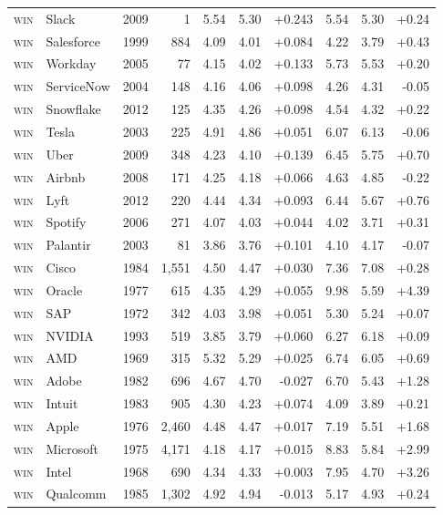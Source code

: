 \begin{tabular}{lllrrrrrrr}
\textsc{win} & Slack & 2009 & 1 & 5.54 & 5.30 & +0.243 & 5.54 & 5.30 & +0.24 \\
\textsc{win} & Salesforce & 1999 & 884 & 4.09 & 4.01 & +0.084 & 4.22 & 3.79 & +0.43 \\
\textsc{win} & Workday & 2005 & 77 & 4.15 & 4.02 & +0.133 & 5.73 & 5.53 & +0.20 \\
\textsc{win} & ServiceNow & 2004 & 148 & 4.16 & 4.06 & +0.098 & 4.26 & 4.31 & -0.05 \\
\textsc{win} & Snowflake & 2012 & 125 & 4.35 & 4.26 & +0.098 & 4.54 & 4.32 & +0.22 \\
\textsc{win} & Tesla & 2003 & 225 & 4.91 & 4.86 & +0.051 & 6.07 & 6.13 & -0.06 \\
\textsc{win} & Uber & 2009 & 348 & 4.23 & 4.10 & +0.139 & 6.45 & 5.75 & +0.70 \\
\textsc{win} & Airbnb & 2008 & 171 & 4.25 & 4.18 & +0.066 & 4.63 & 4.85 & -0.22 \\
\textsc{win} & Lyft & 2012 & 220 & 4.44 & 4.34 & +0.093 & 6.44 & 5.67 & +0.76 \\
\textsc{win} & Spotify & 2006 & 271 & 4.07 & 4.03 & +0.044 & 4.02 & 3.71 & +0.31 \\
\textsc{win} & Palantir & 2003 & 81 & 3.86 & 3.76 & +0.101 & 4.10 & 4.17 & -0.07 \\
\textsc{win} & Cisco & 1984 & 1,551 & 4.50 & 4.47 & +0.030 & 7.36 & 7.08 & +0.28 \\
\textsc{win} & Oracle & 1977 & 615 & 4.35 & 4.29 & +0.055 & 9.98 & 5.59 & +4.39 \\
\textsc{win} & SAP & 1972 & 342 & 4.03 & 3.98 & +0.051 & 5.30 & 5.24 & +0.07 \\
\textsc{win} & NVIDIA & 1993 & 519 & 3.85 & 3.79 & +0.060 & 6.27 & 6.18 & +0.09 \\
\textsc{win} & AMD & 1969 & 315 & 5.32 & 5.29 & +0.025 & 6.74 & 6.05 & +0.69 \\
\textsc{win} & Adobe & 1982 & 696 & 4.67 & 4.70 & -0.027 & 6.70 & 5.43 & +1.28 \\
\textsc{win} & Intuit & 1983 & 905 & 4.30 & 4.23 & +0.074 & 4.09 & 3.89 & +0.21 \\
\textsc{win} & Apple & 1976 & 2,460 & 4.48 & 4.47 & +0.017 & 7.19 & 5.51 & +1.68 \\
\textsc{win} & Microsoft & 1975 & 4,171 & 4.18 & 4.17 & +0.015 & 8.83 & 5.84 & +2.99 \\
\textsc{win} & Intel & 1968 & 690 & 4.34 & 4.33 & +0.003 & 7.95 & 4.70 & +3.26 \\
\textsc{win} & Qualcomm & 1985 & 1,302 & 4.92 & 4.94 & -0.013 & 5.17 & 4.93 & +0.24 \\

\end{tabular}
